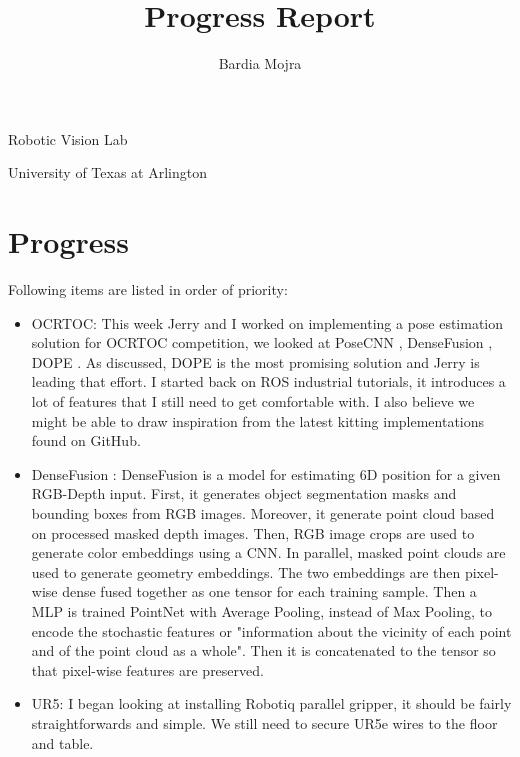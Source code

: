\documentclass[11pt]{article}
\title{Progress Report}
\author{Bardia Mojra}
\begin{document}
\maketitle
\thispagestyle{empty}

\begin{center}
	\bigskip
	\bigskip
	Robotic Vision Lab

	University of Texas at Arlington
\end{center}

\newpage

\section{Progress}
Following items are listed in order of priority:
\begin{itemize}


	\item OCRTOC: This week Jerry and I worked on implementing a pose estimation solution for OCRTOC competition, we looked at PoseCNN \cite{PoseCNN}, DenseFusion \cite{DenseFusion}, DOPE \cite{NVlabs_2020_dope}. As discussed, DOPE is the most promising solution and Jerry is leading that effort. I started back on ROS industrial tutorials, it introduces a lot of features that I still need to get comfortable with. I also believe we might be able to draw inspiration from the latest kitting implementations found on GitHub.

	\item DenseFusion \cite{DenseFusion}: DenseFusion is a model for estimating 6D position for a given RGB-Depth input. First, it generates object segmentation masks and bounding boxes from RGB images. Moreover, it generate point cloud based on processed masked depth images. Then, RGB image crops are used to generate color embeddings using a CNN. In parallel, masked point clouds are used to generate geometry embeddings. The two embeddings are then pixel-wise dense fused together as one tensor for each training sample. Then a MLP is trained PointNet with Average Pooling, instead of Max Pooling, to encode the stochastic features or "information about the vicinity of each point and of the point cloud as a whole". Then it is concatenated to the tensor so that pixel-wise features are preserved.

	\item UR5: I began looking at installing Robotiq parallel gripper, it should be fairly straightforwards and simple. We still need to secure UR5e wires to the floor and table.


\end{itemize}
\end{document}
